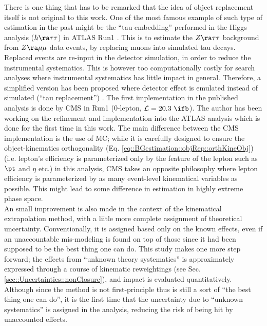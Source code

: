 There is one thing that has to be remarked that the idea of object replacement itself is not original to this work.
One of the most famous example of such type of estimation in the past might be the ``tau embedding'' performed in the Higgs analysis ($h\ra \tau\tau$) in ATLAS Run1 \cite{tauEmbedding}.
This is to estimate the $Z\ra\tau\tau$ background from $Z\ra\mu\mu$ data events, by replacing muons into simulated tau decays.
Replaced events are re-input in the detector simulation, in order to reduce the instrumental systematics.
This is however too computationally costly for search analyses where instrumental systematics has little impact in general. 
Therefore, a simplified version has been proposed where detector effect is emulated instead of simulated (``tau replacement'') \cite{tauReplacement}.
The first implementation in the published analysis is done by CMS in Run1 \cite{CMS_SUSY_jetMET_Run1} (0-lepton, $\mathcal{L}=20.3 \,\,\ifb$).
The author has been working on the refinement and implementation into the ATLAS analysis which is done for the first time in this work.
The main difference between the CMS implementation is the use of MC; 
while it is carefully designed to ensure the object-kinematics orthogonality (Eq. \ref{eq::BGestimation::objRep::orthKineObj}) (i.e. lepton's efficiency is parameterized only by the feature of the lepton such as $\pt$ and $\eta$ etc.) in this analysis, CMS takes an opposite philosophy where lepton efficiency is parameterized by as many event-level kinematical variables as possible. This might lead to some difference in estimation in highly extreme phase space. \\

An small improvement is also made in the context of the kinematical extrapolation method, with a liitle more complete assignment of theoretical uncertainty.
Conventionally, it is assigned based only on the known effects, even if an unaccountable mis-modeling is found on top of those since it had been supposed to be the best thing one can do. 
This study makes one more step forward;
the effects from ``unknown theory systematics'' is approximately expressed through a course of kinematic reweightings (see Sec. \ref{sec::Uncertainties::nonClosure}), and impact is evaluated quantitatively. Although since the method is not first-principle thus is still a sort of ``the best thing one can do'', it is the first time that the uncertainty due to ``unknown systematics'' is assigned in the analysis, reducing the risk of being hit by unaccounted effects. \\



